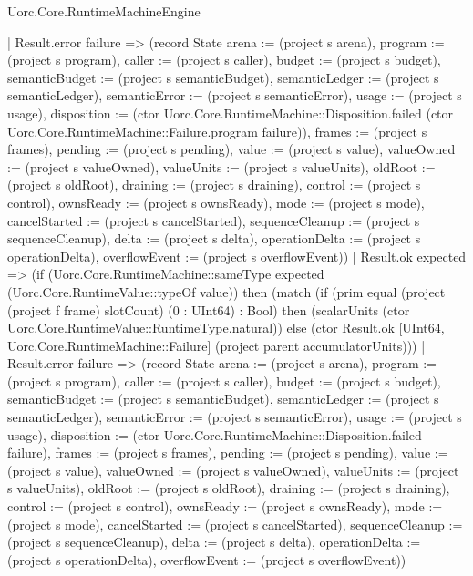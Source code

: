 \begin{lexlean}{Uorc.Core.RuntimeMachineEngine}
\begin{semanticmodule}
{        | Result.error failure => (record State {arena := (project s arena), program := (project s program), caller := (project s caller), budget := (project s budget), semanticBudget := (project s semanticBudget), semanticLedger := (project s semanticLedger), semanticError := (project s semanticError), usage := (project s usage), disposition := (ctor Uorc.Core.RuntimeMachine::Disposition.failed (ctor Uorc.Core.RuntimeMachine::Failure.program failure)), frames := (project s frames), pending := (project s pending), value := (project s value), valueOwned := (project s valueOwned), valueUnits := (project s valueUnits), oldRoot := (project s oldRoot), draining := (project s draining), control := (project s control), ownsReady := (project s ownsReady), mode := (project s mode), cancelStarted := (project s cancelStarted), sequenceCleanup := (project s sequenceCleanup), delta := (project s delta), operationDelta := (project s operationDelta), overflowEvent := (project s overflowEvent)})
        | Result.ok expected => (if (Uorc.Core.RuntimeMachine::sameType expected (Uorc.Core.RuntimeValue::typeOf value)) then (match (if (prim equal (project (project f frame) slotCount) (0 : UInt64) : Bool) then (scalarUnits (ctor Uorc.Core.RuntimeValue::RuntimeType.natural)) else (ctor Result.ok [UInt64, Uorc.Core.RuntimeMachine::Failure] (project parent accumulatorUnits)))
          | Result.error failure => (record State {arena := (project s arena), program := (project s program), caller := (project s caller), budget := (project s budget), semanticBudget := (project s semanticBudget), semanticLedger := (project s semanticLedger), semanticError := (project s semanticError), usage := (project s usage), disposition := (ctor Uorc.Core.RuntimeMachine::Disposition.failed failure), frames := (project s frames), pending := (project s pending), value := (project s value), valueOwned := (project s valueOwned), valueUnits := (project s valueUnits), oldRoot := (project s oldRoot), draining := (project s draining), control := (project s control), ownsReady := (project s ownsReady), mode := (project s mode), cancelStarted := (project s cancelStarted), sequenceCleanup := (project s sequenceCleanup), delta := (project s delta), operationDelta := (project s operationDelta), overflowEvent := (project s overflowEvent)})
}
\end{semanticmodule}
\end{lexlean}
